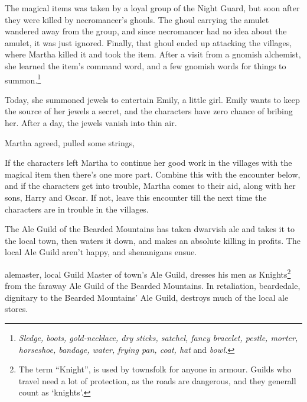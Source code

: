 \begin{multicols}{2}
The magical items was taken by a loyal group of the Night Guard, but soon after they were killed by \gls{necromancer}'s ghouls.
The ghoul carrying the amulet wandered away from the group, and since \gls{necromancer} had no idea about the amulet, it was just ignored.
Finally, that ghoul ended up attacking the villages, where Martha killed it and took the item.
After a visit from a gnomish alchemist, she learned the item's command word, and a few gnomish words for things to summon.\footnote{\textit{Sledge, boots, gold-necklace, dry sticks, satchel, fancy bracelet, pestle, morter, horseshoe, bandage, water, frying pan, coat, hat} and \textit{bowl.}}

Today, she summoned jewels to entertain Emily, a little girl.
Emily wants to keep the source of her jewels a secret, and the characters have zero chance of bribing her.
After a day, the jewels vanish into thin air.

Martha agreed, pulled some strings, 




If the characters left Martha to continue her good work in the villages with the magical item then there's one more part.
Combine this with the encounter below, and if the characters get into trouble, Martha comes to their aid, along with her sons, Harry and Oscar.
If not, leave this encounter till the next time the characters are in trouble in the villages.


\humansoldier

\stopcontents[sq]


\startcontents[sq]

\sqminitoc

The Ale Guild of the Bearded Mountains has taken dwarvish ale and takes it to the local town, then waters it down, and makes an absolute killing in profits.
The local Ale Guild aren't happy, and shenanigans ensue.

\Gls{alemaster}, local Guild Master of town's Ale Guild, dresses his men as Knights\footnote{The term ``Knight'', is used by townsfolk for anyone in armour.  Guilds who travel need a lot of protection, as the roads are dangerous, and they generall count as `knights'.} from the faraway Ale Guild of the Bearded Mountains.  In retaliation, \gls{beardedale}, dignitary to the Bearded Mountains' Ale Guild, destroys much of the local ale stores.


\end{multicols}
